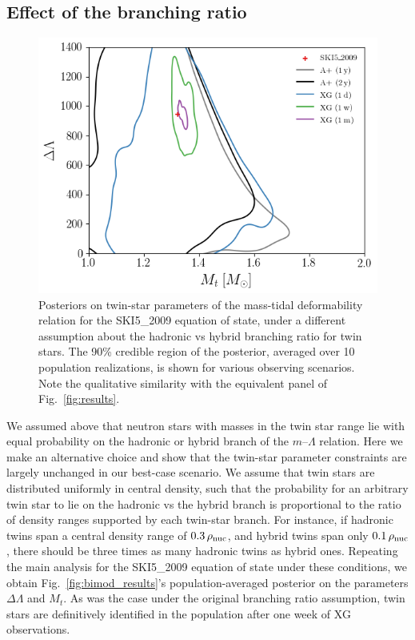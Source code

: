 \documentclass[aps,prd,twocolumn,superscriptaddress,nofootinbib]{revtex4-1}
\begin{document}
\subsection{Effect of the branching ratio}

\begin{figure}[t]
    \includegraphics[width=0.95\columnwidth]{SKI52009_br.png}
    \caption{Posteriors on twin-star parameters of the mass-tidal deformability relation for the SKI5\_2009 equation of state, under a different assumption about the hadronic vs hybrid branching ratio for twin stars. The 90\% credible region of the posterior, averaged over 10 population realizations, is shown for various observing scenarios. Note the qualitative similarity with the equivalent panel of Fig.~\ref{fig:results}.}
    \label{fig:branch_results}
\end{figure}

We assumed above that neutron stars with masses in the twin star range lie with equal probability on the hadronic or hybrid branch of the $m$--$\Lambda$ relation. Here we make an alternative choice and show that the twin-star parameter constraints are largely unchanged in our best-case scenario.  We assume that twin stars are distributed uniformly in central density, such that the probability for an arbitrary twin star to lie on the hadronic vs the hybrid branch is proportional to the ratio of density ranges supported by each twin-star branch. For instance, if hadronic twins span a central density range of $0.3\,\rho_{\rm nuc}$, and hybrid twins span only $0.1\,\rho_{\rm nuc}$, there should be three times as many hadronic twins as hybrid ones. Repeating the main analysis for the SKI5\_2009 equation of state under these conditions, we obtain Fig.~\ref{fig:bimod_results}'s population-averaged posterior on the parameters $\Delta\Lambda$ and $M_t$. As was the case under the original branching ratio assumption, twin stars are definitively identified in the population after one week of XG observations.
\end{document}
